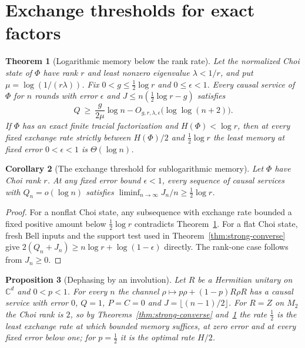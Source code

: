 \documentclass[11pt,a4paper]{article}
\theoremstyle{plain}
\newtheorem{theorem}{Theorem}[section]
\newtheorem{proposition}[theorem]{Proposition}
\newtheorem{corollary}[theorem]{Corollary}
\theoremstyle{definition}
\theoremstyle{remark}
\begin{document}
\section{Exchange thresholds for exact factors}\label{sec:exact-regimes}


\begin{theorem}[Logarithmic memory below the rank rate]\label{thm:log-lower}
Let the normalized Choi state of $\Phi$ have rank $r$ and least nonzero eigenvalue $\lambda<1/r$, and put $\mu=\log(1/(r\lambda))$.
Fix $0<g\le\frac12\log r$ and $0\le\epsilon<1$. Every causal service of $\Phi$ for $n$ rounds with error $\epsilon$ and
$J\le n(\frac12\log r-g)$ satisfies
\[
Q\ \ge\ \frac{g}{2\mu}\log n-O_{g,r,\lambda,\epsilon}\big(\log\log(n+2)\big).
\]
If $\Phi$ has an exact finite tracial factorization and $H(\Phi)<\log r$, then at every fixed exchange rate strictly between
$H(\Phi)/2$ and $\frac12\log r$ the least memory at fixed error $0<\epsilon<1$ is $\Theta(\log n)$.
\end{theorem}

\begin{corollary}[The exchange threshold for sublogarithmic memory]\label{cor:sublog}
Let $\Phi$ have Choi rank $r$. At any fixed error bound $\epsilon<1$, every sequence of causal services with
$Q_n=o(\log n)$ satisfies $\liminf_{n\to\infty}J_n/n\ge\frac12\log r$.
\end{corollary}

\begin{proof}
For a nonflat Choi state, any subsequence with exchange rate bounded a fixed positive amount below $\frac12\log r$
contradicts Theorem~\ref{thm:log-lower}. For a flat Choi state, fresh Bell inputs and the support test used in
Theorem~\ref{thm:strong-converse} give $2(Q_n+J_n)\ge n\log r+\log(1-\epsilon)$ directly.
The rank-one case follows from $J_n\ge0$.
\end{proof}

\begin{proposition}[Dephasing by an involution]\label{prop:dephasing}
Let $R$ be a Hermitian unitary on $\mathbb C^d$ and $0<p<1$. For every $n$ the channel $\rho\mapsto p\rho+(1-p)R\rho R$ has a causal
service with error $0$, $Q=1$, $P=C=0$ and $J=\lfloor(n-1)/2\rfloor$. For $R=Z$ on $M_2$ the Choi rank is $2$, so by
Theorems~\ref{thm:strong-converse} and~\ref{thm:log-lower} the rate $\frac12$ is the least exchange rate at which bounded memory
suffices, at zero error and at every fixed error below one; for $p=\frac12$ it is the optimal rate $H/2$.
\end{proposition}
\end{document}
